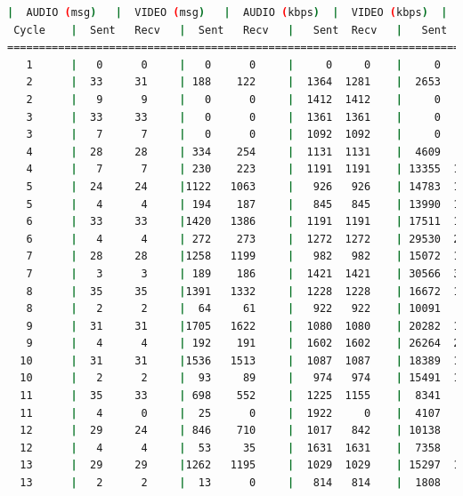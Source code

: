 \begin{lstlisting}[language=bash,basicstyle=\ttfamily\scriptsize]
          |  AUDIO (msg)   |  VIDEO (msg)   |  AUDIO (kbps)  |  VIDEO (kbps)  |   CPU (%)
 Cycle    |  Sent   Recv   |  Sent   Recv   |   Sent  Recv   |   Sent  Recv   | Program System
============================================================================================
   1      |   0      0     |   0      0     |     0     0    |     0     0    |   0      0
   2      |  33     31     | 188    122     |  1364  1281    |  2653   1723   |  44     63
   2      |   9      9     |   0      0     |  1412  1412    |     0      0   |  52     68
   3      |  33     33     |   0      0     |  1361  1361    |     0      0   |  36     74
   3      |   7      7     |   0      0     |  1092  1092    |     0      0   |  38     73
   4      |  28     28     | 334    254     |  1131  1131    |  4609   3501   |  34     71
   4      |   7      7     | 230    223     |  1191  1191    | 13355  12961   |  20     71
   5      |  24     24     |1122   1063     |   926   926    | 14783  14005   |  31     73
   5      |   4      4     | 194    187     |   845   845    | 13990  13501   |  32     73
   6      |  33     33     |1420   1386     |  1191  1191    | 17511  17091   |  26     74
   6      |   4      4     | 272    273     |  1272  1272    | 29530  29664   |  19     73
   7      |  28     28     |1258   1199     |   982   982    | 15072  14365   |  33     71
   7      |   3      3     | 189    186     |  1421  1421    | 30566  30080   |  57     71
   8      |  35     35     |1391   1332     |  1228  1228    | 16672  15961   |  39     70
   8      |   2      2     |  64     61     |   922   922    | 10091   9582   |  42     70
   9      |  31     31     |1705   1622     |  1080  1080    | 20282  19296   |  42     71
   9      |   4      4     | 192    191     |  1602  1602    | 26264  26127   |  36     73
  10      |  31     31     |1536   1513     |  1087  1087    | 18389  18113   |  39     73
  10      |   2      2     |  93     89     |   974   974    | 15491  14786   |  44     73
  11      |  35     33     | 698    552     |  1225  1155    |  8341   6597   |  36     72
  11      |   4      0     |  25      0     |  1922     0    |  4107      0   |  44     69
  12      |  29     24     | 846    710     |  1017   842    | 10138   8509   |  28     69
  12      |   4      4     |  53     35     |  1631  1631    |  7358   4880   |  49     71
  13      |  29     29     |1262   1195     |  1029  1029    | 15297  14482   |  21     73
  13      |   2      2     |  13      0     |   814   814    |  1808      0   |  24     73

\end{lstlisting}
